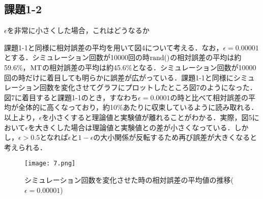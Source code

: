 \documentclass[12pt]{jarticle}
\begin{document}
\subsection{課題1-2}
\begin{shadebox}
    \quad $\epsilon$を非常に小さくした場合，これはどうなるか
\end{shadebox}
\vspace{\baselineskip}
課題1-1と同様に相対誤差の平均を用いて図4について考える．なお，$\epsilon=0.00001$とする．シミュレーション回数が10000回の時$\rm{rand()}$の相対誤差の平均は約59.6\%，$\rm{MT}$の相対誤差の平均は約45.6\%となる．シミュレーション回数が10000回の時だけに着目しても明らかに誤差が広がっている．課題1-1と同様にシミュレーション回数を変化させてグラフにプロットしたところ図7のようになった．図7に着目すると課題1-1のとき，すなわち$\epsilon=0.0001$の時と比べて相対誤差の平均が全体的に高くなっており，約10\%あたりに収束しているように読み取れる．以上より，$\epsilon$を小さくすると理論値と実験値が離れることがわかる．実際，図5において$\epsilon$を大きくした場合は理論値と実験値との差が小さくなっている．しかし，$\epsilon>0.5$となれば$\epsilon$と$1-\epsilon$の大小関係が反転するため再び誤差が大きくなると考えられる．
\begin{figure}[H]
    \begin{center}
        \texttt{[image: 7.png]}
    \end{center}
    \caption{シミュレーション回数を変化させた時の相対誤差の平均値の推移($\epsilon=0.00001$)}
    \label{fig1}
\end{figure}
\end{document}
